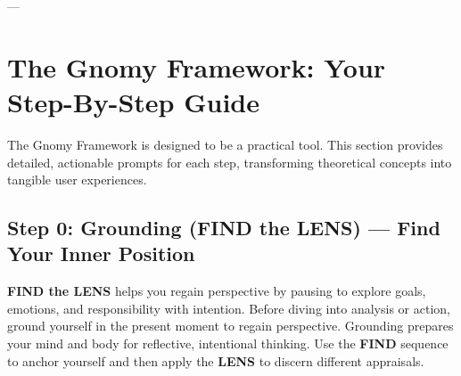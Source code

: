 \documentclass{article}
\begin{document}
---

\section{The Gnomy Framework: Your Step-By-Step Guide}
The Gnomy Framework is designed to be a practical tool. This section provides detailed, actionable prompts for each step, transforming theoretical concepts into tangible user experiences.

\subsection{Step 0: Grounding (FIND the LENS) — Find Your Inner Position}
\textbf{FIND the LENS} helps you regain perspective by pausing to explore goals, emotions, and responsibility with intention. Before diving into analysis or action, ground yourself in the present moment to regain perspective. Grounding prepares your mind and body for reflective, intentional thinking. Use the \textbf{FIND} sequence to anchor yourself and then apply the \textbf{LENS} to discern different appraisals.

\begin{center}
\end{center}
\end{document}
